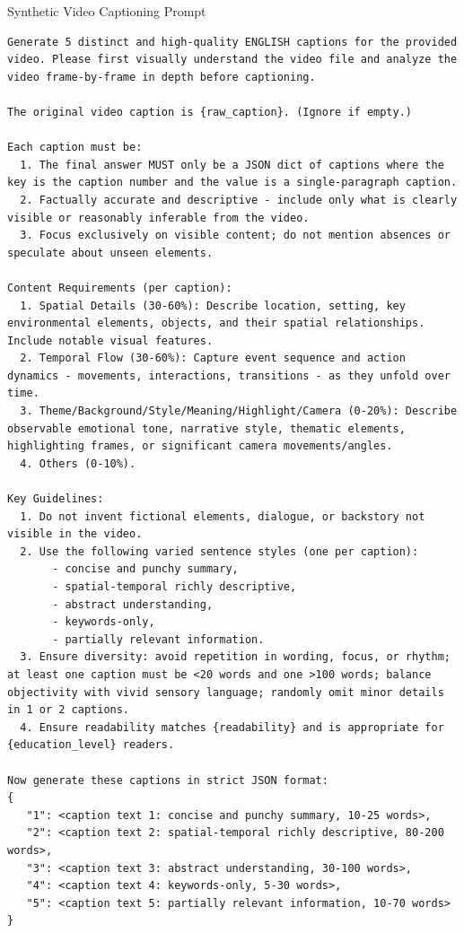 \begin{promptbox}{Synthetic Video Captioning Prompt}
\begin{lstlisting}[style=promptstyle]
Generate 5 distinct and high-quality ENGLISH captions for the provided video. Please first visually understand the video file and analyze the video frame-by-frame in depth before captioning.

The original video caption is {raw_caption}. (Ignore if empty.)

Each caption must be:
  1. The final answer MUST only be a JSON dict of captions where the key is the caption number and the value is a single-paragraph caption.
  2. Factually accurate and descriptive - include only what is clearly visible or reasonably inferable from the video.
  3. Focus exclusively on visible content; do not mention absences or speculate about unseen elements.

Content Requirements (per caption):
  1. Spatial Details (30-60%): Describe location, setting, key environmental elements, objects, and their spatial relationships. Include notable visual features.
  2. Temporal Flow (30-60%): Capture event sequence and action dynamics - movements, interactions, transitions - as they unfold over time.
  3. Theme/Background/Style/Meaning/Highlight/Camera (0-20%): Describe observable emotional tone, narrative style, thematic elements, highlighting frames, or significant camera movements/angles.
  4. Others (0-10%).

Key Guidelines:
  1. Do not invent fictional elements, dialogue, or backstory not visible in the video.
  2. Use the following varied sentence styles (one per caption):
       - concise and punchy summary,
       - spatial-temporal richly descriptive,
       - abstract understanding,
       - keywords-only,
       - partially relevant information.
  3. Ensure diversity: avoid repetition in wording, focus, or rhythm; at least one caption must be <20 words and one >100 words; balance objectivity with vivid sensory language; randomly omit minor details in 1 or 2 captions.
  4. Ensure readability matches {readability} and is appropriate for {education_level} readers.

Now generate these captions in strict JSON format:
{
   "1": <caption text 1: concise and punchy summary, 10-25 words>,
   "2": <caption text 2: spatial-temporal richly descriptive, 80-200 words>,
   "3": <caption text 3: abstract understanding, 30-100 words>,
   "4": <caption text 4: keywords-only, 5-30 words>,
   "5": <caption text 5: partially relevant information, 10-70 words>
}
\end{lstlisting}
\end{promptbox}

